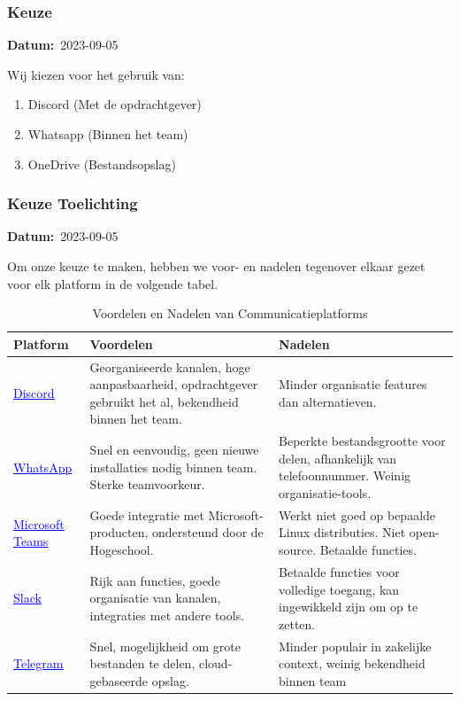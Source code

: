 \documentclass[a4paper]{report}
\newcommand{\styledhref}[2]{%
    \href{#1}{\textcolor{blue}{\underline{#2}}} %
}
\newcommand{\timestamp}[1]{
  \mbox{\scriptsize \textbf{Datum:} #1} \smallbreak
}
\begin{document}
\subsubsection{Keuze}
\timestamp{2023-09-05}
Wij kiezen voor het gebruik van:
\begin{enumerate}
  \item Discord (Met de opdrachtgever)
  \item Whatsapp (Binnen het team)
  \item OneDrive (Bestandsopslag)
\end{enumerate}

\subsubsection{Keuze Toelichting}
\timestamp{2023-09-05}
Om onze keuze te maken, hebben we voor- en nadelen tegenover elkaar gezet voor elk platform in de volgende tabel.
\begin{table}[H]
  \centering
  \begin{tabular}{|l|p{6cm}|p{6cm}|}
    \hline
    \textbf{Platform} & \textbf{Voordelen} & \textbf{Nadelen} \\
    \hline
    \styledhref{https://discord.com/}{Discord} & Georganiseerde kanalen, hoge aanpasbaarheid, opdrachtgever gebruikt het al, bekendheid binnen het team. & Minder organisatie features dan alternatieven. \\
    \hline
    \styledhref{https://www.whatsapp.com/}{WhatsApp} & Snel en eenvoudig, geen nieuwe installaties nodig binnen team. Sterke teamvoorkeur. & Beperkte bestandsgrootte voor delen, afhankelijk van telefoonnummer. Weinig organisatie-tools. \\
    \hline
    \styledhref{https://www.microsoft.com/en-us/microsoft-teams/group-chat-software}{Microsoft Teams} & Goede integratie met Microsoft-producten, ondersteund door de Hogeschool. & Werkt niet goed op bepaalde Linux distributies. Niet open-source. Betaalde functies. \\
    \hline
    \styledhref{https://slack.com/}{Slack} & Rijk aan functies, goede organisatie van kanalen, integraties met andere tools. & Betaalde functies voor volledige toegang, kan ingewikkeld zijn om op te zetten. \\
    \hline
    \styledhref{https://telegram.org/}{Telegram} & Snel, mogelijkheid om grote bestanden te delen, cloud-gebaseerde opslag. & Minder populair in zakelijke context, weinig bekendheid binnen team \\
    \hline
  \end{tabular}
  \caption{Voordelen en Nadelen van Communicatieplatforms}
  \label{tab:comm_pros_cons}
\end{table}
\end{document}
